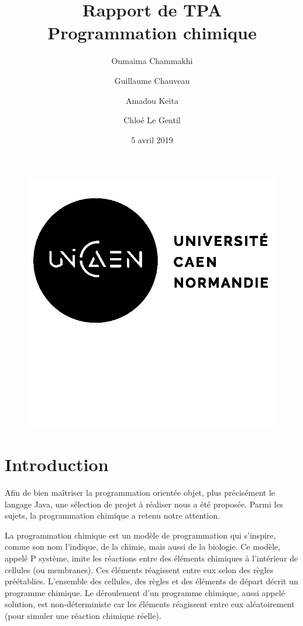 \documentclass[a4paper, 12pt]{article}
\title{Rapport de TPA \\ Programmation chimique}
\author{Oumaima Chammakhi \and Guillaume Chauveau \and Amadou Keita \and Chloé Le Gentil}
\date{5 avril 2019}
\begin{document}
\begin{figure}
  \includegraphics{img/logo.png}
\end{figure}
\maketitle
\thispagestyle{empty}
\setcounter{page}{0}

\pagebreak
\tableofcontents
\pagebreak

\section{Introduction}
Afin de bien maîtriser la programmation orientée objet, plus précisément le langage Java, une sélection de projet à réaliser nous a été proposée. Parmi les sujets, la programmation chimique a retenu notre attention.

La programmation chimique est un modèle de programmation qui s’inspire, comme son nom l’indique, de la chimie, mais aussi de la biologie. Ce modèle, appelé P système, imite les réactions entre des éléments chimiques à l’intérieur de cellules (ou membranes). Ces éléments réagissent entre eux selon des règles préétablies. L’ensemble des cellules, des règles et des éléments de départ décrit un programme chimique. Le déroulement d’un programme chimique, aussi appelé solution, est non-déterministe car les éléments réagissent entre eux aléatoirement (pour simuler une réaction chimique réelle).
\end{document}
